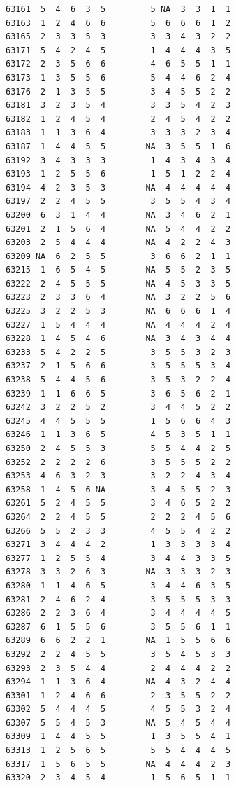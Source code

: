 \documentclass[
  letterpaper,
  DIV=11,
  numbers=noendperiod]{scrreprt}
\begin{document}
\begin{verbatim}
63161  5  4  6  3  5         5 NA  3  3  1  1
63163  1  2  4  6  6         5  6  6  6  1  2
63165  2  3  3  5  3         3  3  4  3  2  2
63171  5  4  2  4  5         1  4  4  4  3  5
63172  2  3  5  6  6         4  6  5  5  1  1
63173  1  3  5  5  6         5  4  4  6  2  4
63176  2  1  3  5  5         3  4  5  5  2  2
63181  3  2  3  5  4         3  3  5  4  2  3
63182  1  2  4  5  4         2  4  5  4  2  2
63183  1  1  3  6  4         3  3  3  2  3  4
63187  1  4  4  5  5        NA  3  5  5  1  6
63192  3  4  3  3  3         1  4  3  4  3  4
63193  1  2  5  5  6         1  5  1  2  2  4
63194  4  2  3  5  3        NA  4  4  4  4  4
63197  2  2  4  5  5         3  5  5  4  3  4
63200  6  3  1  4  4        NA  3  4  6  2  1
63201  2  1  5  6  4        NA  5  4  4  2  2
63203  2  5  4  4  4        NA  4  2  2  4  3
63209 NA  6  2  5  5         3  6  6  2  1  1
63215  1  6  5  4  5        NA  5  5  2  3  5
63222  2  4  5  5  5        NA  4  5  3  3  5
63223  2  3  3  6  4        NA  3  2  2  5  6
63225  3  2  2  5  3        NA  6  6  6  1  4
63227  1  5  4  4  4        NA  4  4  4  2  4
63228  1  4  5  4  6        NA  3  4  3  4  4
63233  5  4  2  2  5         3  5  5  3  2  3
63237  2  1  5  6  6         3  5  5  5  3  4
63238  5  4  4  5  6         3  5  3  2  2  4
63239  1  1  6  6  5         3  6  5  6  2  1
63242  3  2  2  5  2         3  4  4  5  2  2
63245  4  4  5  5  5         1  5  6  6  4  3
63246  1  1  3  6  5         4  5  3  5  1  1
63250  2  4  5  5  3         5  5  4  4  2  5
63252  2  2  2  2  6         3  5  5  5  2  2
63253  4  6  3  2  3         3  2  2  4  3  4
63258  1  4  5  6 NA         3  4  5  5  2  3
63261  5  2  4  5  5         3  4  6  5  2  2
63264  2  2  4  5  5         2  2  2  4  5  6
63266  5  5  2  3  3         4  5  5  4  2  2
63271  3  4  4  4  2         1  3  3  3  3  4
63277  1  2  5  5  4         3  4  4  3  3  5
63278  3  3  2  6  3        NA  3  3  3  2  3
63280  1  1  4  6  5         3  4  4  6  3  5
63281  2  4  6  2  4         3  5  5  5  3  3
63286  2  2  3  6  4         3  4  4  4  4  5
63287  6  1  5  5  6         3  5  5  6  1  1
63289  6  6  2  2  1        NA  1  5  5  6  6
63292  2  2  4  5  5         3  5  4  5  3  3
63293  2  3  5  4  4         2  4  4  4  2  2
63294  1  1  3  6  4        NA  4  3  2  4  4
63301  1  2  4  6  6         2  3  5  5  2  2
63302  5  4  4  4  5         4  5  5  3  2  4
63307  5  5  4  5  3        NA  5  4  5  4  4
63309  1  4  4  5  5         1  3  5  5  4  1
63313  1  2  5  6  5         5  5  4  4  4  5
63317  1  5  6  5  5        NA  4  4  4  2  3
63320  2  3  4  5  4         1  5  6  5  1  1

\end{verbatim}
\end{document}
